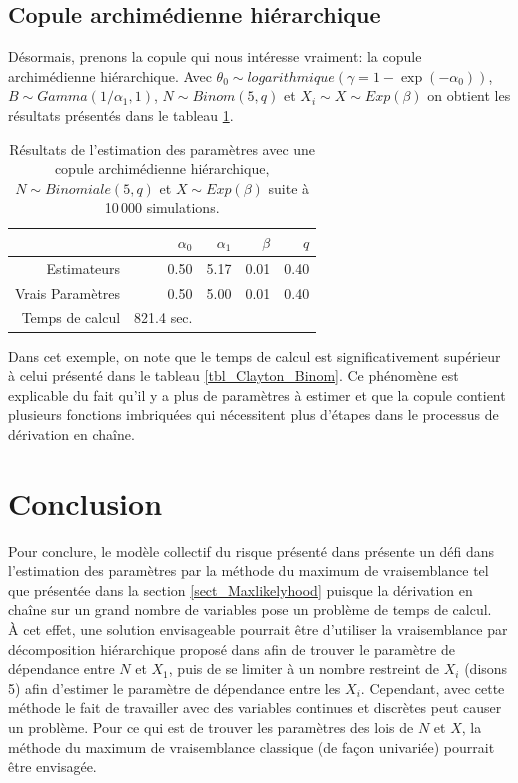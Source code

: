 \documentclass{article}
\begin{document}
	\subsection{Copule archimédienne hiérarchique}
	Désormais, prenons la copule qui nous intéresse vraiment: la copule archimédienne hiérarchique. Avec $\theta_0 \sim logarithmique\left(\gamma = 1-\exp(-\alpha_0)\right)$, $B \sim Gamma(1/\alpha_1, 1)$, $N \sim Binom(5,q)$ et $X_i \sim X \sim Exp(\beta)$ on obtient les résultats présentés dans le tableau \ref{tbl_archi_hierar}.
	\begin{table}[H]
		\centering
		\begin{tabular}{rrrrr}
			\hline
			& $\alpha_{0}$ & $\alpha_{1}$ & $\beta$ & $q$ \\ 
			\hline
			Estimateurs & 0.50 & 5.17 & 0.01 & 0.40 \\ 
			Vrais Paramètres & 0.50 & 5.00 & 0.01 & 0.40 \\ 
			\hline
			Temps de calcul & 821.4 sec. \\
			\hline
		\end{tabular}
		\renewcommand{\tablename}{Tableau}
		\caption[Estimations avec une copule archimédienne hiérarchique et $N\sim Binomiale$]{Résultats de l'estimation des paramètres avec une copule archimédienne hiérarchique, $N \sim Binomiale(5, q)$ et $X \sim Exp(\beta)$ suite à 10\,000 simulations.} \label{tbl_archi_hierar}
	\end{table}

	Dans cet exemple, on note que le temps de calcul est significativement supérieur à celui présenté dans le tableau \ref{tbl_Clayton_Binom}. Ce phénomène est explicable du fait qu'il y a plus de paramètres à estimer et que la copule contient plusieurs fonctions imbriquées qui nécessitent plus d'étapes dans le processus de dérivation en chaîne.
	
	\section{Conclusion}
	Pour conclure, le modèle collectif du risque présenté dans \cite{Itre5} présente un défi dans l'estimation des paramètres par la méthode du maximum de vraisemblance tel que présentée dans la section \ref{sect_Maxlikelyhood} puisque la dérivation en chaîne sur un grand nombre de variables pose un problème de temps de calcul.\\
	
	 À cet effet, une solution envisageable pourrait être d'utiliser la vraisemblance par décomposition hiérarchique proposé dans \cite{LikelyhoodEstimation} afin de trouver le paramètre de dépendance entre $N$ et $X_1$, puis de se limiter à un nombre restreint de $X_i$ (disons 5) afin d'estimer le paramètre de dépendance entre les $X_i$. Cependant, avec cette méthode le fait de travailler avec des variables continues et discrètes peut causer un problème. Pour ce qui est de trouver les paramètres des lois de $N$ et $X$, la méthode du maximum de vraisemblance classique (de façon univariée) pourrait être envisagée.
 
	
	\clearpage
	
	
\end{document}
